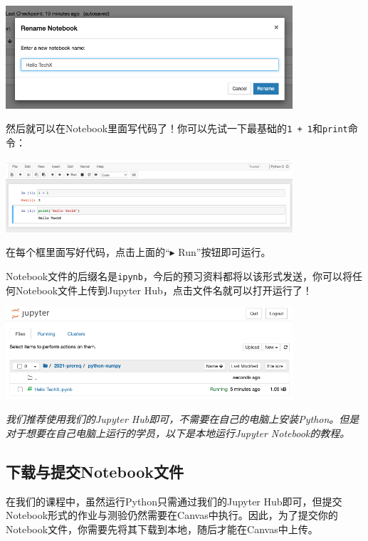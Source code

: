 \documentclass{article}
\begin{document}
\vspace*{0.3cm}\centerline{\noindent\includegraphics[width=0.8\textwidth]{ipynb-rename.png}}

然后就可以在Notebook里面写代码了！你可以先试一下最基础的\texttt{1 + 1}和\texttt{print}命令：

\vspace*{0.3cm}\centerline{\noindent\includegraphics[width=0.8\textwidth]{ipynb-code.png}}

在每个框里面写好代码，点击上面的“$\blacktriangleright$ Run”按钮即可运行。

Notebook文件的后缀名是\texttt{ipynb}，今后的预习资料都将以该形式发送，你可以将任何Notebook文件上传到Jupyter Hub，点击文件名就可以打开运行了！

\vspace*{0.3cm}\centerline{\noindent\includegraphics[width=0.8\textwidth]{ipynb-open.png}}

\emph{我们推荐使用我们的Jupyter Hub即可，不需要在自己的电脑上安装Python。但是对于想要在自己电脑上运行的学员，以下是本地运行Jupyter Notebook的教程。}

  \subsection{下载与提交Notebook文件}
  在我们的课程中，虽然运行Python只需通过我们的Jupyter Hub即可，但提交Notebook形式的作业与测验仍然需要在Canvas中执行。因此，为了提交你的Notebook文件，你需要先将其下载到本地，随后才能在Canvas中上传。
  
\end{document}
